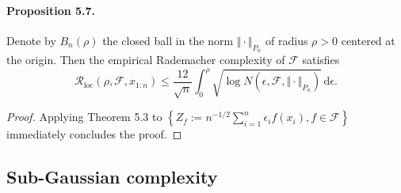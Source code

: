 \documentclass{article}
\begin{document}
\paragraph{Proposition 5.7.} Denote by $B_n(\rho)$ the closed ball in the norm $\Vert\cdot\Vert_{P_n}$ of radius $\rho > 0$ centered at the origin. Then the empirical Rademacher complexity of $\mathcal{F}$ satisfies
\begin{equation*}
	\mathcal{R}_{\mathrm{loc}}(\rho,\mathcal{F},x_{1:n})\leq\frac{12}{\sqrt{n}}\int_0^\rho\sqrt{\log N(\epsilon,\mathcal{F},\Vert\cdot\Vert_{P_n})}\,\mathrm{d}\epsilon.\tag{5.22}
\end{equation*}
\begin{proof}
	Applying Theorem 5.3 to $\left\{Z_f:=n^{-1/2}\sum_{i=1}^n\epsilon_if(x_i),f\in\mathcal{F}\right\}$ immediately concludes the proof.
\end{proof}

\subsection{Sub-Gaussian complexity}
\end{document}
